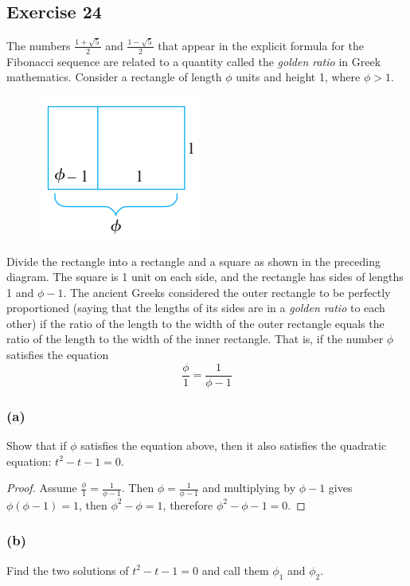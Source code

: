 \documentclass[14pt]{extarticle}
\begin{document}
\subsection{Exercise 24}
The numbers \(\frac{1 + \sqrt{5}}{2}\) and \(\frac{1 - \sqrt{5}}{2}\) that appear in the explicit formula for the 
Fibonacci sequence are related to a quantity called the {\it golden ratio} in Greek mathematics. Consider a 
rectangle of length $\phi$ units and height 1, where \(\phi > 1\).

\begin{figure}[ht!]
\centering
\includegraphics[scale=0.5]{../images/5.8.24.png}
\end{figure}

Divide the rectangle into a rectangle and a square as shown in the preceding diagram. The square is 1 unit on each 
side, and the rectangle has sides of lengths 1 and $\phi - 1$. The ancient Greeks considered the outer rectangle to be 
perfectly proportioned (saying that the lengths of its sides are in a {\it golden ratio} to each other) if the 
ratio of the length to the width of the outer rectangle equals the ratio of the length to the width of the inner 
rectangle. That is, if the number $\phi$ satisfies the equation
\[
\frac{\phi}{1} = \frac{1}{\phi - 1}
\]
\subsubsection{(a)}
Show that if $\phi$ satisfies the equation above, then it also satisfies the quadratic equation: \(t^2 - t - 1 = 0\).

\begin{proof}
Assume \(\frac{\phi}{1} = \frac{1}{\phi - 1}\). Then \(\phi = \frac{1}{\phi - 1}\) and multiplying by $\phi - 1$ gives
\(\phi(\phi-1) = 1\), then \(\phi^2 - \phi = 1\), therefore \(\phi^2 - \phi - 1 = 0\).
\end{proof}

\subsubsection{(b)}
Find the two solutions of \(t^2 - t - 1 = 0\) and call them $\phi_1$ and $\phi_2$.
\end{document}
